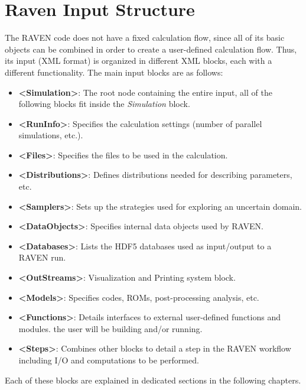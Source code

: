 \section{Raven Input Structure}
The RAVEN code does not have a fixed calculation flow, since all of its basic
objects can be combined in order to create a user-defined calculation flow.
%
Thus, its input (XML format) is organized in different XML blocks, each with a
different functionality.
%
The main input blocks are as follows:
\begin{itemize}
  \item \textbf{\textless Simulation\textgreater}: The root node containing the
  entire input, all of
  the following blocks fit inside the \emph{Simulation} block.
  \item \textbf{\textless RunInfo\textgreater}: Specifies the calculation
  settings (number of parallel simulations, etc.).
  \item \textbf{\textless Files\textgreater}: Specifies the files to be
  used in the calculation.
  \item \textbf{\textless Distributions\textgreater}: Defines distributions
  needed for describing parameters, etc.
  \item \textbf{\textless Samplers\textgreater}: Sets up the strategies used for
  exploring an uncertain domain.
  \item \textbf{\textless DataObjects\textgreater}: Specifies internal data objects
  used by RAVEN.
  \item \textbf{\textless Databases\textgreater}: Lists the HDF5 databases used
  as input/output to a
  RAVEN run.
  \item \textbf{\textless OutStreams\textgreater}: Visualization and
  Printing system block.
  \item \textbf{\textless Models\textgreater}: Specifies codes, ROMs,
  post-processing analysis, etc.
  \item \textbf{\textless Functions\textgreater}: Details interfaces to external
  user-defined functions and modules.
  the user will be building and/or running.
  \item \textbf{\textless Steps\textgreater}: Combines other blocks to detail a
  step in the RAVEN workflow including I/O and computations to be performed.
\end{itemize}

Each of these blocks are explained in dedicated sections in the following
chapters.
%
